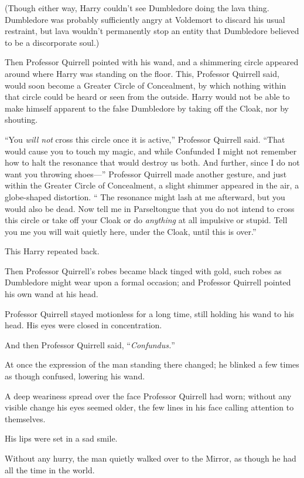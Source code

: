 (Though either way, Harry couldn’t see Dumbledore doing the lava thing. Dumbledore was probably sufficiently angry at Voldemort to discard his usual restraint, but lava wouldn’t permanently stop an entity that Dumbledore believed to be a discorporate soul.)

Then Professor Quirrell pointed with his wand, and a shimmering circle appeared around where Harry was standing on the floor. This, Professor Quirrell said, would soon become a Greater Circle of Concealment, by which nothing within that circle could be heard or seen from the outside. Harry would not be able to make himself apparent to the false Dumbledore by taking off the Cloak, nor by shouting.

“You \emph{will not} cross this circle once it is active,” Professor Quirrell said. “That would cause you to touch my magic, and while Confunded I might not remember how to halt the resonance that would destroy us both. And further, since I do not want you throwing shoes—” Professor Quirrell made another gesture, and just within the Greater Circle of Concealment, a slight shimmer appeared in the air, a globe-shaped distortion. “ The resonance might lash at me afterward, but you would also be dead. Now tell me in Parseltongue that you do not intend to cross this circle or take off your Cloak or do \emph{anything} at all impulsive or stupid. Tell you me you will wait quietly here, under the Cloak, until this is over.”

This Harry repeated back.

Then Professor Quirrell’s robes became black tinged with gold, such robes as Dumbledore might wear upon a formal occasion; and Professor Quirrell pointed his own wand at his head.

Professor Quirrell stayed motionless for a long time, still holding his wand to his head. His eyes were closed in concentration.

And then Professor Quirrell said, “\emph{Confundus.}”

At once the expression of the man standing there changed; he blinked a few times as though confused, lowering his wand.

A deep weariness spread over the face Professor Quirrell had worn; without any visible change his eyes seemed older, the few lines in his face calling attention to themselves.

His lips were set in a sad smile.

Without any hurry, the man quietly walked over to the Mirror, as though he had all the time in the world.

